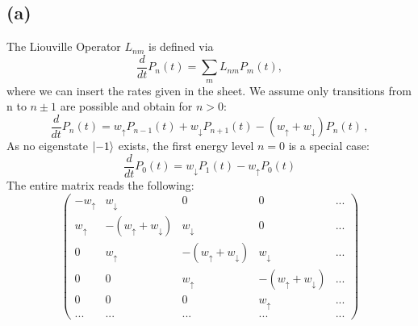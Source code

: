 \documentclass{article}
\begin{document}
\subsection*{(a)}
The Liouville Operator $L_{nm}$ is defined via
\[
\frac{d}{dt} P_n(t) = \sum_m L_{nm} P_m(t),
\]
where we can insert the rates given in the sheet. We assume only transitions from n to $n\pm 1$ are possible and obtain for $n > 0$:
\[
    \frac{d}{dt} P_n(t) =  w_\uparrow P_{n-1}(t) + w_\downarrow P_{n+1}(t) - (w_\uparrow + w_\downarrow) P_{n}(t) \, ,
\]
As no eigenstate $\ket{-1}$ exists, the first energy level $n = 0$ is a special case:
\[
     \frac{d}{dt} P_0(t) = w_\downarrow P_{1}(t) - w_\uparrow P_{0}(t)
\]
The entire matrix reads the following:
\[
\begin{pmatrix}
- w_\uparrow &       w_\downarrow        &      0       & 0 & ... \\
  w_\uparrow & -(w_\uparrow + w_\downarrow) & w_\downarrow & 0 & ... \\
     0       &   w_\uparrow & -(w_\uparrow + w_\downarrow) & w_\downarrow & ... \\
     0       & 0 & w_\uparrow & -(w_\uparrow + w_\downarrow)  & ... \\
     0       & 0 & 0 & w_\uparrow & ... \\
     ...&...&...&...&...
\end{pmatrix}
\]
\end{document}
